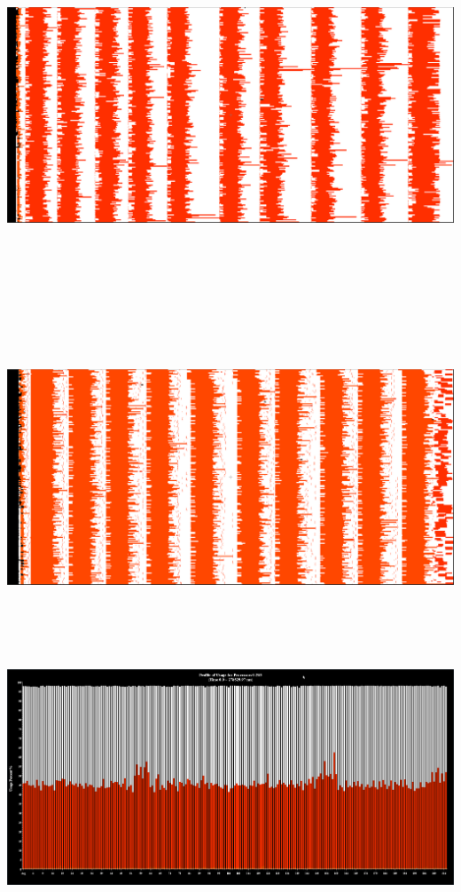 \documentclass{book}
\begin{document}

\ \\
\includegraphics[width=6.8in, height=4in]{overview-rc.png} \\ \ \\
\includegraphics[width=5.325in, height=4in]{overview-cr.png}
\newpage
\ \\
\includegraphics[width=6.5in]{usage-rc.png} \\ \ \\
\end{document}
